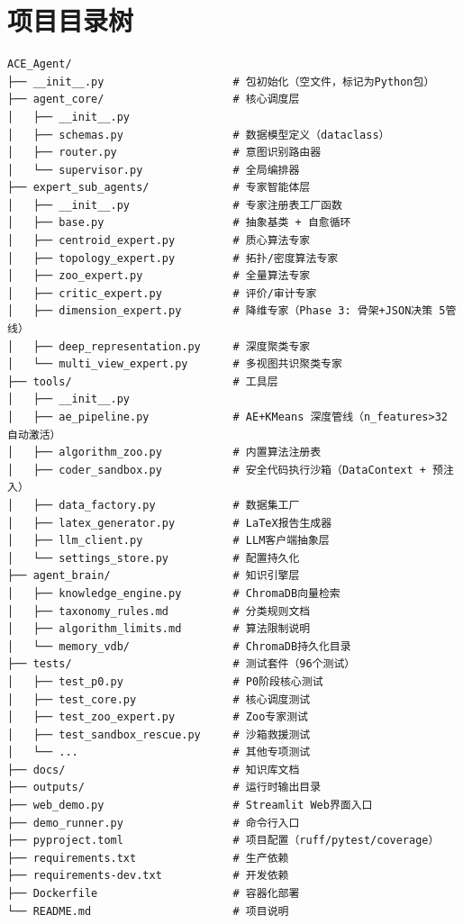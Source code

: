 \documentclass[11pt,a4paper]{ctexbook}
\begin{document}
\section{项目目录树}

\begin{verbatim}
ACE_Agent/
├── __init__.py                    # 包初始化（空文件，标记为Python包）
├── agent_core/                    # 核心调度层
│   ├── __init__.py
│   ├── schemas.py                 # 数据模型定义（dataclass）
│   ├── router.py                  # 意图识别路由器
│   └── supervisor.py              # 全局编排器
├── expert_sub_agents/             # 专家智能体层
│   ├── __init__.py                # 专家注册表工厂函数
│   ├── base.py                    # 抽象基类 + 自愈循环
│   ├── centroid_expert.py         # 质心算法专家
│   ├── topology_expert.py         # 拓扑/密度算法专家
│   ├── zoo_expert.py              # 全量算法专家
│   ├── critic_expert.py           # 评价/审计专家
│   ├── dimension_expert.py        # 降维专家（Phase 3: 骨架+JSON决策 5管线）
│   ├── deep_representation.py     # 深度聚类专家
│   └── multi_view_expert.py       # 多视图共识聚类专家
├── tools/                         # 工具层
│   ├── __init__.py
│   ├── ae_pipeline.py             # AE+KMeans 深度管线（n_features>32 自动激活）
│   ├── algorithm_zoo.py           # 内置算法注册表
│   ├── coder_sandbox.py           # 安全代码执行沙箱（DataContext + 预注入）
│   ├── data_factory.py            # 数据集工厂
│   ├── latex_generator.py         # LaTeX报告生成器
│   ├── llm_client.py              # LLM客户端抽象层
│   └── settings_store.py          # 配置持久化
├── agent_brain/                   # 知识引擎层
│   ├── knowledge_engine.py        # ChromaDB向量检索
│   ├── taxonomy_rules.md          # 分类规则文档
│   ├── algorithm_limits.md        # 算法限制说明
│   └── memory_vdb/                # ChromaDB持久化目录
├── tests/                         # 测试套件（96个测试）
│   ├── test_p0.py                 # P0阶段核心测试
│   ├── test_core.py               # 核心调度测试
│   ├── test_zoo_expert.py         # Zoo专家测试
│   ├── test_sandbox_rescue.py     # 沙箱救援测试
│   └── ...                        # 其他专项测试
├── docs/                          # 知识库文档
├── outputs/                       # 运行时输出目录
├── web_demo.py                    # Streamlit Web界面入口
├── demo_runner.py                 # 命令行入口
├── pyproject.toml                 # 项目配置（ruff/pytest/coverage）
├── requirements.txt               # 生产依赖
├── requirements-dev.txt           # 开发依赖
├── Dockerfile                     # 容器化部署
└── README.md                      # 项目说明
\end{verbatim}
\end{document}
